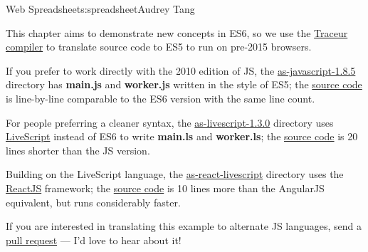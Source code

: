 \begin{aosachapter}{Web Spreadsheet}{s:spreadsheet}{Audrey Tang}
\label{a-note-on-js-versions}

This chapter aims to demonstrate new concepts in ES6, so we use the
\href{https://github.com/google/traceur-compiler}{Traceur compiler} to
translate source code to ES5 to run on pre-2015 browsers.

If you prefer to work directly with the 2010 edition of JS, the
\href{https://audreyt.github.io/500lines/spreadsheet/as-javascript-1.8.5/}{as-javascript-1.8.5}
directory has \textbf{main.js} and \textbf{worker.js} written in the
style of ES5; the
\href{https://github.com/audreyt/500lines/tree/master/spreadsheet/as-javascript-1.8.5}{source
code} is line-by-line comparable to the ES6 version with the same line
count.

For people preferring a cleaner syntax, the
\href{https://audreyt.github.io/500lines/spreadsheet/as-livescript-1.3.0/}{as-livescript-1.3.0}
directory uses \href{http://livescript.net/}{LiveScript} instead of ES6
to write \textbf{main.ls} and \textbf{worker.ls}; the
\href{https://github.com/audreyt/500lines/tree/master/spreadsheet/as-livescript-1.3.0}{source
code} is 20 lines shorter than the JS version.

Building on the LiveScript language, the
\href{https://audreyt.github.io/500lines/spreadsheet/as-react-livescript/}{as-react-livescript}
directory uses the \href{https://facebook.github.io/react/}{ReactJS}
framework; the
\href{https://github.com/audreyt/500lines/tree/master/spreadsheet/as-react-livescript}{source
code} is 10 lines more than the AngularJS equivalent, but runs
considerably faster.

If you are interested in translating this example to alternate JS
languages, send a \href{https://github.com/audreyt/500lines/pulls}{pull
request} --- I'd love to hear about it!

\end{aosachapter}
